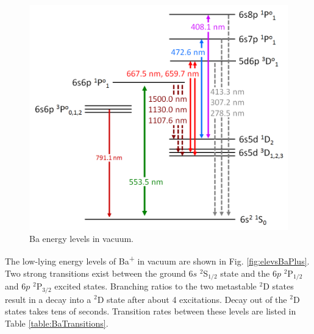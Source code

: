 \begin{figure} %
	\includegraphics[width=.8\textwidth]{figures/elevs_Ba_extra_with3P1.png}
	\caption{Ba energy levels in vacuum.}
    \label{fig:elevsBa}
\end{figure}

The low-lying energy levels of Ba\textsuperscript{+} in vacuum are shown in Fig. \ref{fig:elevsBaPlus}.  Two strong transitions exist between the ground $6s$ $^{2}$S$_{1/2}$ state and the $6p$ $^{2}$P$_{1/2}$ and $6p$ $^{2}$P$_{3/2}$ excited states.  Branching ratios to the two metastable $^{2}$D states result in a decay into a $^{2}$D state after about 4 excitations.  Decay out of the $^{2}$D states takes tens of seconds.  Transition rates between these levels are listed in Table \ref{table:BaTransitions}.    

